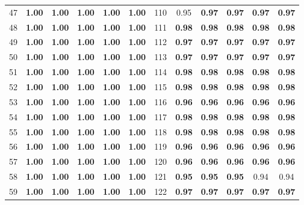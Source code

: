 \documentclass{article}
\begin{document}
{\begin{longtable}{cccccc@{\qquad}cccccc}
47 & \textbf{1.00} & \textbf{1.00} & \textbf{1.00} & \textbf{1.00} & \textbf{1.00} & 110 & 0.95 & \textbf{0.97} & \textbf{0.97} & \textbf{0.97} & \textbf{0.97} \\
48 & \textbf{1.00} & \textbf{1.00} & \textbf{1.00} & \textbf{1.00} & \textbf{1.00} & 111 & \textbf{0.98} & \textbf{0.98} & \textbf{0.98} & \textbf{0.98} & \textbf{0.98} \\
49 & \textbf{1.00} & \textbf{1.00} & \textbf{1.00} & \textbf{1.00} & \textbf{1.00} & 112 & \textbf{0.97} & \textbf{0.97} & \textbf{0.97} & \textbf{0.97} & \textbf{0.97} \\
50 & \textbf{1.00} & \textbf{1.00} & \textbf{1.00} & \textbf{1.00} & \textbf{1.00} & 113 & \textbf{0.97} & \textbf{0.97} & \textbf{0.97} & \textbf{0.97} & \textbf{0.97} \\
51 & \textbf{1.00} & \textbf{1.00} & \textbf{1.00} & \textbf{1.00} & \textbf{1.00} & 114 & \textbf{0.98} & \textbf{0.98} & \textbf{0.98} & \textbf{0.98} & \textbf{0.98} \\
52 & \textbf{1.00} & \textbf{1.00} & \textbf{1.00} & \textbf{1.00} & \textbf{1.00} & 115 & \textbf{0.98} & \textbf{0.98} & \textbf{0.98} & \textbf{0.98} & \textbf{0.98} \\
53 & \textbf{1.00} & \textbf{1.00} & \textbf{1.00} & \textbf{1.00} & \textbf{1.00} & 116 & \textbf{0.96} & \textbf{0.96} & \textbf{0.96} & \textbf{0.96} & \textbf{0.96} \\
54 & \textbf{1.00} & \textbf{1.00} & \textbf{1.00} & \textbf{1.00} & \textbf{1.00} & 117 & \textbf{0.98} & \textbf{0.98} & \textbf{0.98} & \textbf{0.98} & \textbf{0.98} \\
55 & \textbf{1.00} & \textbf{1.00} & \textbf{1.00} & \textbf{1.00} & \textbf{1.00} & 118 & \textbf{0.98} & \textbf{0.98} & \textbf{0.98} & \textbf{0.98} & \textbf{0.98} \\
56 & \textbf{1.00} & \textbf{1.00} & \textbf{1.00} & \textbf{1.00} & \textbf{1.00} & 119 & \textbf{0.96} & \textbf{0.96} & \textbf{0.96} & \textbf{0.96} & \textbf{0.96} \\
57 & \textbf{1.00} & \textbf{1.00} & \textbf{1.00} & \textbf{1.00} & \textbf{1.00} & 120 & \textbf{0.96} & \textbf{0.96} & \textbf{0.96} & \textbf{0.96} & \textbf{0.96} \\
58 & \textbf{1.00} & \textbf{1.00} & \textbf{1.00} & \textbf{1.00} & \textbf{1.00} & 121 & \textbf{0.95} & \textbf{0.95} & \textbf{0.95} & 0.94 & 0.94 \\
59 & \textbf{1.00} & \textbf{1.00} & \textbf{1.00} & \textbf{1.00} & \textbf{1.00} & 122 & \textbf{0.97} & \textbf{0.97} & \textbf{0.97} & \textbf{0.97} & \textbf{0.97} \\

\end{longtable}}
\end{document}
